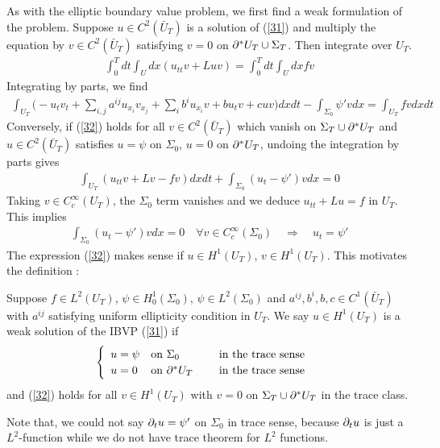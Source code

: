 \documentclass[12pt,a4paper]{report}
\begin{document}
As with the elliptic boundary value problem, we first find a weak formulation of the problem. Suppose $u\in C^2(\bar{U}_T)$ is a solution of (\ref{31}) and multiply the equation by $v\in C^2(\bar{U}_T)$ satisfying $v=0$ on $\partial^* U_T \cup \Sigma_T$. Then integrate over $U_T$.
\begin{align*}
\int_0^T dt \int_U dx (u_{tt} v + Luv) = \int_0^T dt \int_U dx fv
\end{align*}
Integrating by parts, we find
\begin{align}
\int_{U_T} \Big( -u_t v_t + \sum_{i,j} a^{ij}u_{x_i} v_{x_j} + \sum_i b^i u_{x_i} v + bu_t v  + cuv \Big) dxdt - \int_{\Sigma_0} \psi' v dx = \int_{U_T} fv dx dt \label{32}
\end{align}
Conversely, if (\ref{32}) holds for all $v\in C^2(\bar{U}_T)$ which vanish on $\Sigma_T \cup \partial^* U_T$ and $u\in C^2(\bar{U}_T)$ satisfies $u= \psi$ on $\Sigma_0$, $u=0$ on $\partial^* U_T$, undoing the integration by parts gives
\begin{align*}
\int_{U_T} (u_{tt}v + Lv - fv) dxdt + \int_{\Sigma_0} (u_t - \psi') vdx =0
\end{align*}
Taking $v\in C_c^{\infty}(U_T)$, the $\Sigma_0$ term vanishes and we deduce $u_{tt} + Lu = f$ in $U_T$. This implies
\begin{align*}
\int_{\Sigma_0} (u_t - \psi') vdx =0 \quad \forall v \in C_c^{\infty}(\Sigma_0) \quad \Rightarrow \quad u_t = \psi'
\end{align*}
The expression (\ref{32}) makes sense if $u\in H^1(U_T)$, $v\in H^1(U_T)$. This motivates the definition :
\s

 Suppose $f\in L^2(U_T)$, $\psi \in H_0^1(\Sigma_0)$, $\psi \in L^2(\Sigma_0)$ and $a^{ij}, b^i, b, c \in C^1(\bar{U}_T)$ with $a^{ij}$ satisfying uniform ellipticity condition in $U_T$. We say $u\in H^1(U_T)$ is a weak solution of the IBVP (\ref{31}) if
\begin{align*}
\begin{cases}
\begin{array}{lll}
u = \psi & \text{on } \Sigma_0 & \quad \text{ in the trace sense} \\
u = 0 & \text{on } \partial^* U_T & \quad \text{ in the trace sense}
\end{array}
\end{cases}
\end{align*}
and (\ref{32}) holds for all $v\in H^1(U_T)$ with $v=0$ on $\Sigma_T \cup \partial^* U_T$ in the trace class.
\s

Note that, we could not say $\partial_t u = \psi'$ on $\Sigma_0$ in trace sense, because $\partial_t u$ is just a $L^2$-function while we do not have trace theorem for $L^2$ functions.
\s
\end{document}
